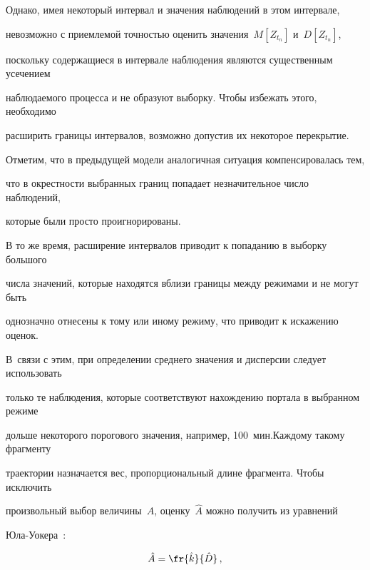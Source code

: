       


      Однако, имея некоторый интервал и значения наблюдений в этом интервале, 


невозможно с приемлемой точностью оценить значения~$M[Z_{t_n}]$ и~$D[Z_{t_n}]$, 


поскольку содержащиеся в интервале наблюдения являются существенным усечением 


наблюдаемого процесса и не образуют выборку. Чтобы избежать этого, необходимо 


расширить границы интервалов, возможно допустив их некоторое перекрытие.


      


      Отметим, что в предыдущей модели аналогичная ситуация компенсировалась тем, 


что в окрестности выбранных границ попадает незначительное число наблюдений, 


которые были просто проигнорированы.


      


      В то же время, расширение интервалов приводит к попаданию в выборку большого 


числа значений, которые находятся вблизи границы между режимами и не могут быть 


однозначно отнесены к тому или иному режиму, что приводит к искажению оценок. 


В~связи с этим, при определении среднего значения и дисперсии следует использовать 


только те наблюдения, которые соответствуют нахождению портала в выбранном режиме 


дольше некоторого порогового значения, например, 100~мин.\linebreak Каж\-до\-му такому фрагменту 


траектории назначается вес, пропорциональный длине фрагмента. Чтобы исключить 


произвольный выбор величины~$A$, оценку~$\hat{A}$ можно получить из уравнений 


      Юла-Уокера~\cite{5-8}:


      \begin{equation*}


      \hat{A} =\fr{\hat{k}}{\hat{D}}\,,




      \end{equation*}


